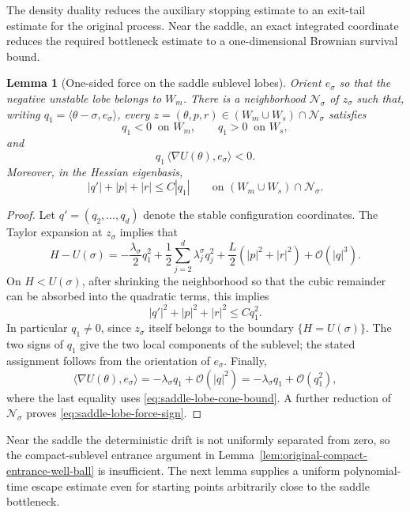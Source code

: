 \documentclass[11pt]{article}
\numberwithin{equation}{section}
\theoremstyle{plain}
\newtheorem{lemma}[theorem]{Lemma}
\theoremstyle{definition}
\theoremstyle{remark}
\begin{document}
The density duality reduces the auxiliary stopping estimate to
an exit-tail estimate for the original process.  Near the saddle, an exact
integrated coordinate reduces the required bottleneck estimate to a
one-dimensional Brownian survival bound.

\begin{lemma}[One-sided force on the saddle sublevel lobes]
\label{lem:saddle-lobe-force-sign}
Orient $e_\sigma$ so that the negative unstable lobe belongs to $W_m$.
There is a neighborhood $\mathcal N_\sigma$ of $z_\sigma$ such that, writing
$q_1=\langle\theta-\sigma,e_\sigma\rangle$, every
$z=(\theta,p,r)\in(W_m\cup W_s)\cap\mathcal N_\sigma$ satisfies
\[
q_1<0\ \text{ on }W_m,
\qquad
q_1>0\ \text{ on }W_s,
\]
and
\begin{equation}
\label{eq:saddle-lobe-force-sign}
q_1\,\langle\nabla U(\theta),e_\sigma\rangle<0.
\end{equation}
Moreover, in the Hessian eigenbasis,
\begin{equation}
\label{eq:saddle-lobe-cone-bound}
|q'|+|p|+|r|\le C|q_1|
\qquad\text{on }(W_m\cup W_s)\cap\mathcal N_\sigma.
\end{equation}
\end{lemma}

\begin{proof}
Let $q'=(q_2,\ldots,q_d)$ denote the stable configuration coordinates.  The
Taylor expansion at $z_\sigma$ implies that
\[
H-U(\sigma)
=-\frac{\lambda_\sigma}{2}q_1^2
{}+\frac12\sum_{j=2}^d\lambda_j^\sigma q_j^2
{}+\frac L2\left(|p|^2+|r|^2\right)
{}+\mathcal O(|q|^3).
\]
On $H<U(\sigma)$, after shrinking the neighborhood so that the cubic
remainder can be absorbed into the quadratic terms, this implies
\[
|q'|^2+|p|^2+|r|^2\le Cq_1^2.
\]
In particular $q_1\ne0$, since $z_\sigma$ itself belongs to the boundary
$\{H=U(\sigma)\}$.  The two signs of $q_1$ give the two local components of
the sublevel; the stated assignment follows from the orientation of
$e_\sigma$.  Finally,
\[
\langle\nabla U(\theta),e_\sigma\rangle
=-\lambda_\sigma q_1+\mathcal O(|q|^2)
=-\lambda_\sigma q_1+\mathcal O(q_1^2),
\]
where the last equality uses \eqref{eq:saddle-lobe-cone-bound}.  A further
reduction of $\mathcal N_\sigma$ proves
\eqref{eq:saddle-lobe-force-sign}.
\end{proof}

Near the saddle the deterministic drift is not uniformly separated from
zero, so the compact-sublevel entrance argument in
Lemma~\ref{lem:original-compact-entrance-well-ball} is insufficient.
The next lemma supplies a uniform polynomial-time escape estimate even for
starting points arbitrarily close to the saddle bottleneck.
\end{document}
